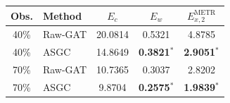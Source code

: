 \begin{tabular}{clccc}
\toprule
Obs. & Method & $E_c$ & $E_w$ & $E_{x,2}^{\mathrm{METR}}$\\
\midrule
40\% & Raw-GAT & 20.0814 & 0.5321 & 4.8785\\
40\% & ASGC & 14.8649 & \textbf{0.3821}$^*$ & \textbf{2.9051}$^*$\\
70\% & Raw-GAT & 10.7365 & 0.3037 & 2.8202\\
70\% & ASGC & 9.8704 & \textbf{0.2575}$^*$ & \textbf{1.9839}$^*$\\
\bottomrule
\end{tabular}
